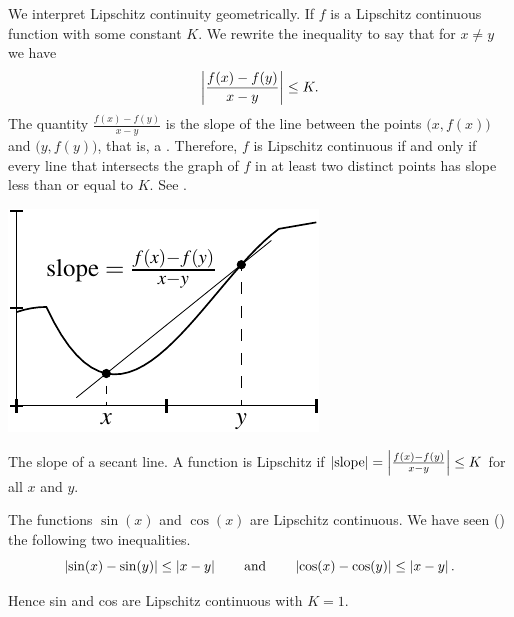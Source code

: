 We interpret Lipschitz continuity geometrically.  If $f$ is a Lipschitz
continuous function with some constant $K$.  We rewrite the inequality 
to say that for $x \not=y$ we have
\begin{equation*}
\left\lvert {\frac{f(x)-f(y)}{x-y}} \right\rvert \leq K .
\end{equation*}
The quantity $\frac{f(x)-f(y)}{x-y}$ is the slope of the line
between the points $\bigl(x,f(x)\bigr)$
and $\bigl(y,f(y)\bigr)$, that is, a \emph{}.  Therefore, $f$ is Lipschitz
continuous if and only if every line that intersects the graph of $f$ in at least two
distinct
points has slope less than or equal to $K$.  See .
\begin{myfigureht}
\includegraphics{figures/lipschitzfig}
\caption{The slope of a secant line.
A function is Lipschitz if $\left\lvert {\text{slope}} \right\rvert =
\left\lvert {\frac{f(x)-f(y)}{x-y}} \right\rvert \leq K$ for all $x$ and $y$.\label{fig:lipschitz}}
\end{myfigureht}

\begin{example}
The functions $\sin(x)$ and $\cos(x)$ are Lipschitz continuous.
We have seen () the following two inequalities.
\begin{equation*}
\left\lvert {\sin(x)-\sin(y)} \right\rvert 
\leq \left\lvert {x-y} \right\rvert
\qquad \text{and} \qquad
\left\lvert {\cos(x)-\cos(y)} \right\rvert
\leq \left\lvert {x-y} \right\rvert .
\end{equation*}

Hence sin and cos are Lipschitz continuous with $K=1$.
\end{example}

